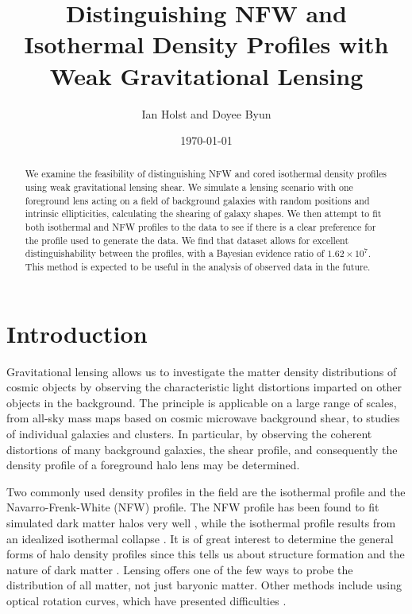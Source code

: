 \documentclass[10pt]{article}
\begin{document}
\title{Distinguishing NFW and Isothermal Density Profiles with Weak Gravitational Lensing}
\author{Ian Holst and Doyee Byun}
\date{\today}
\maketitle

\begin{abstract}
We examine the feasibility of distinguishing NFW and cored isothermal density profiles using weak gravitational lensing shear. We simulate a lensing scenario with one foreground lens acting on a field of background galaxies with random positions and intrinsic ellipticities, calculating the shearing of galaxy shapes. We then attempt to fit both isothermal and NFW profiles to the data to see if there is a clear preference for the profile used to generate the data. We find that dataset allows for excellent distinguishability between the profiles, with a Bayesian evidence ratio of $1.62 \times 10^7$. This method is expected to be useful in the analysis of observed data in the future.
\end{abstract}


\section{Introduction}
Gravitational lensing allows us to investigate the matter density distributions of cosmic objects by observing the characteristic light distortions imparted on other objects in the background. The principle is applicable on a large range of scales, from all-sky mass maps based on cosmic microwave background shear, to studies of individual galaxies and clusters. In particular, by observing the coherent distortions of many background galaxies, the shear profile, and consequently the density profile of a foreground halo lens may be determined.

Two commonly used density profiles in the field are the isothermal profile and the Navarro-Frenk-White (NFW) profile. The NFW profile has been found to fit simulated dark matter halos very well \citep{Navarro1997}, while the isothermal profile results from an idealized isothermal collapse \citep{Shapiro1999}. It is of great interest to determine the general forms of halo density profiles since this tells us about structure formation and the nature of dark matter \citep{Frenk2012}. Lensing offers one of the few ways to probe the distribution of all matter, not just baryonic matter. Other methods include using optical rotation curves, which have presented difficulties \citep{Jimenez2003}.
\end{document}
